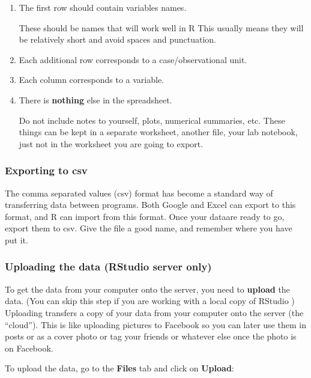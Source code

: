 \documentclass[]{book}
\begin{document}
\begin{enumerate}
\def\labelenumi{\arabic{enumi}.}
\item
  The first row should contain variables names.

  These should be names that will work well in R This usually means they will be relatively short and avoid spaces and punctuation.
\item
  Each additional row corresponds to a case/observational unit.
\item
  Each column corresponds to a variable.
\item
  There is \textbf{nothing} else in the spreadsheet.

  Do not include notes to yourself, plots, numerical summaries, etc. These things can be kept in a separate worksheet, another file, your lab notebook, just not in the worksheet you are going to export.
\end{enumerate}

\hypertarget{exporting-to-csv}{%
\subsubsection{Exporting to csv}\label{exporting-to-csv}}

The comma separated values (csv) format has become a standard way of transferring data between programs. Both Google and Excel can export to this format, and R can import from this format. Once your dataare ready to go, export them to csv. Give the file a good name, and remember where you have put it.

\hypertarget{uploading-the-data-rstudio-server-only}{%
\subsubsection{Uploading the data (RStudio server only)}\label{uploading-the-data-rstudio-server-only}}

To get the data from your computer onto the server, you need to \textbf{upload} the data. (You can skip this step if you are working with a local copy of RStudio ) Uploading transfers a copy of your data from your computer onto the server (the ``cloud''). This is like uploading pictures to Facebook so you can later use them in posts or as a cover photo or tag your friends or whatever else once the photo is on Facebook.

To upload the data, go to the \textbf{Files} tab and click on \textbf{Upload}:
\end{document}
